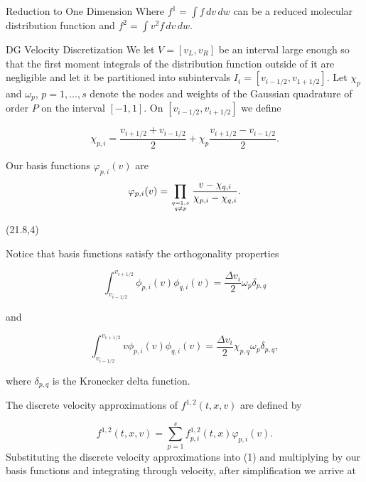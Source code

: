 \documentclass[unknownkeysallowed,final]{beamer}
\begin{document}
\begin{frame}{}
\begin{textblock}{19.5}
\begin{block}{\small{Reduction to One Dimension}}
Where $f^{1} = \int f \, dv \, dw $ can be a reduced molecular distribution function and $f^{2} = \int v^{2} f \, dv \, dw $.
\end{block}

\begin{block}{\small{DG Velocity Discretization}}
We let $V=[v_{L}, v_{R}]$ be an interval large enough so that the first moment integrals of the distribution function outside of it are negligible and let it be partitioned into subintervals $I_{i}=[v_{i-1/2},v_{1+1/2}]$. Let $\chi_{p}$ and $\omega_{p}$, $p=1,\ldots,s$ denote the nodes and weights of the Gaussian quadrature of order $P$ on the interval $[-1,1]$. On $[v_{i-1/2},v_{i+1/2}]$ we define

\begin{equation*}
\label{Chi}
\chi_{p,i} = \frac{v_{i+1/2} + v_{i-1/2}}{2} + \chi_{p}\frac{v_{i+1/2} - v_{i-1/2}}{2}.
\end{equation*}

Our basis functions $\varphi_{p,i}(v)$ are
\begin{equation*}
\varphi_{p,i}(v) = \prod\limits_{q=1,s \atop q \neq p} \frac{v-\chi_{q,i}}{\chi_{p,i} - \chi_{q,i}}.
\end{equation*}
\end{block}

	\end{textblock}

	\begin{textblock}{18}(21.8,4)

 \begin{block}{\small{}}
Notice that basis functions satisfy the orthogonality properties

\begin{equation*}
\int_{v_{i-1/2}}^{v_{i+1/2}} \phi_{p,i}(v) \phi_{q,i}(v) = \frac{\Delta v_{i}}{2} \omega_{p} \delta_{p,q}
\end{equation*}

and

\begin{equation*}
\int_{v_{i-1/2}}^{v_{i+1/2}} v \phi_{p,i}(v) \phi_{q,i}(v) = \frac{\Delta v_{i}}{2} \chi_{p,q} \omega_{p} \delta_{p,q},
\end{equation*}

where $\delta_{p,q}$ is the Kronecker delta function.

The discrete velocity approximations of $f^{1,2}(t,x,v)$ are defined by

\begin{equation*}
\label{eq0x}
f^{1,2}(t,x,v)=\sum_{p=1} ^{s} f_{p,i}^{1,2}(t,x) \varphi_{p,i}(v).
\end{equation*}
Substituting the discrete velocity approximations into (1) and multiplying by our basis functions and integrating through velocity, after simplification we arrive at


\end{block}
\end{textblock}
\end{frame}
\end{document}
